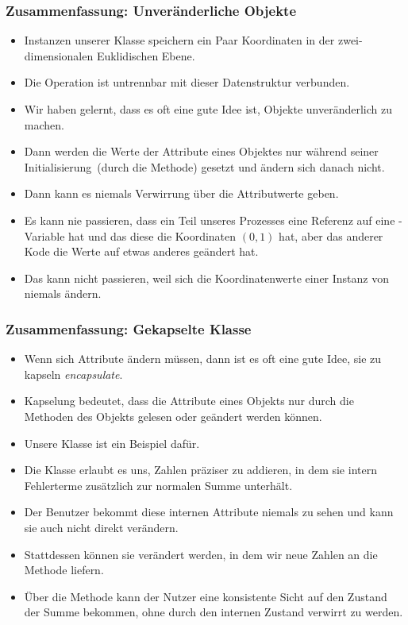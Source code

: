 \documentclass[aspectratio=169,mathserif,notheorems]{beamer}%
\begin{document}
%
\begin{frame}%
\frametitle{Zusammenfassung: Unveränderliche Objekte}%
\begin{itemize}%
\item Instanzen unserer Klasse  speichern ein Paar Koordinaten in der zwei-dimensionalen Euklidischen Ebene.%
%
\item<2-> Die Operation  ist untrennbar mit dieser Datenstruktur verbunden.%
%
\item<3-> Wir haben gelernt, dass es oft eine gute Idee ist, Objekte unveränderlich zu machen.%
%
\item<4-> Dann werden die Werte der Attribute eines Objektes nur während seiner Initialisierung~(durch die  Methode) gesetzt und ändern sich danach nicht.%
%
\item<5-> Dann kann es niemals Verwirrung über die Attributwerte geben.%
%
\item<6-> Es kann nie passieren, dass ein Teil unseres Prozesses eine Referenz auf eine -Variable hat und  das diese die Koordinaten $(0,1)$ hat, aber das anderer Kode die Werte auf etwas anderes geändert hat.%
%
\item<7-> Das kann nicht passieren, weil sich die Koordinatenwerte einer Instanz von  niemals ändern.%
\end{itemize}%
\end{frame}%
%
\begin{frame}%
\frametitle{Zusammenfassung: Gekapselte Klasse}%
\begin{itemize}%
\item Wenn sich Attribute ändern müssen, dann ist es oft eine gute Idee, sie zu kapseln \emph{encapsulate}.%
%
\item<2-> Kapselung bedeutet, dass die Attribute eines Objekts nur durch die Methoden des Objekts gelesen oder geändert werden können.%
%
\item<3-> Unsere Klasse  ist ein Beispiel dafür.%
%
\item<4-> Die Klasse erlaubt es uns, Zahlen präziser zu addieren, in dem sie intern Fehlerterme zusätzlich zur normalen Summe unterhält.%
%
\item<5-> Der Benutzer bekommt diese internen Attribute niemals zu sehen und kann sie auch nicht direkt verändern.%
%
\item<6-> Stattdessen können sie verändert werden, in dem wir neue Zahlen an die Methode  liefern.%
%
\item<7-> Über die Methode  kann der Nutzer eine konsistente Sicht auf den Zustand der Summe bekommen, ohne durch den internen Zustand verwirrt zu werden.%
\end{itemize}%
\end{frame}%
\end{document}
